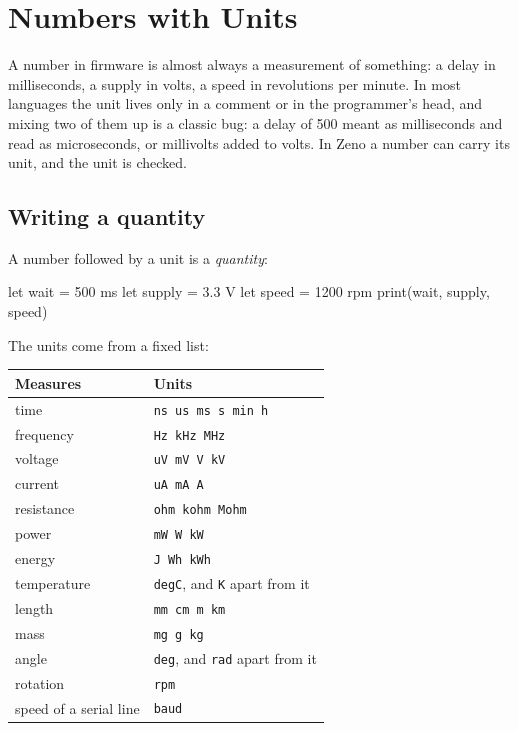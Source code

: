\chapter{Numbers with Units}\label{ch-units}

A number in firmware is almost always a measurement of something: a
delay in milliseconds, a supply in volts, a speed in revolutions per
minute. In most languages the unit lives only in a comment or in the
programmer's head, and mixing two of them up is a classic bug: a delay
of 500 meant as milliseconds and read as microseconds, or millivolts
added to volts. In Zeno a number can carry its unit, and the unit is
checked.

\section{Writing a quantity}

A number followed by a unit is a \emph{quantity}:

\begin{zeno}
let wait = 500 ms
let supply = 3.3 V
let speed = 1200 rpm
print(wait, supply, speed)
\end{zeno}

The units come from a fixed list:

\begin{center}
\begin{tabular}{ll}
\toprule
Measures & Units \\
\midrule
time & \verb|ns us ms s min h| \\
frequency & \verb|Hz kHz MHz| \\
voltage & \verb|uV mV V kV| \\
current & \verb|uA mA A| \\
resistance & \verb|ohm kohm Mohm| \\
power & \verb|mW W kW| \\
energy & \verb|J Wh kWh| \\
temperature & \verb|degC|, and \verb|K| apart from it \\
length & \verb|mm cm m km| \\
mass & \verb|mg g kg| \\
angle & \verb|deg|, and \verb|rad| apart from it \\
rotation & \verb|rpm| \\
speed of a serial line & \verb|baud| \\
\bottomrule
\end{tabular}
\end{center}

